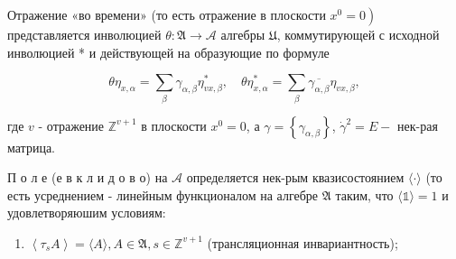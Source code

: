 \documentclass[10pt]{article}
\begin{document}
Отражение «во времени» (то есть отражение в плоскости $\left.x^{0}=0\right)$ представляется инволюцией $\theta: \mathfrak{A} \rightarrow \mathscr{A}$ алгебры $\mathfrak{U}$, коммутирующей с исходной инволюцией * и действующей на образующие по формуле



\[

\theta \eta_{x, \alpha}=\sum_{\beta} \gamma_{\alpha, \beta} \eta_{v x, \beta}^{*}, \quad \theta \eta_{x, \alpha}^{*}=\sum_{\beta} \overline{\gamma_{\alpha, \beta}} \eta_{v x, \beta},

\]



где $v$ - отражение $\mathbb{Z}^{v+1}$ в плоскости $x^{0}=0$, а $\gamma=\left\{\gamma_{\alpha, \beta}\right\}$, $\dot{\gamma}^{2}=E-$ нек-рая матрица.



П о л е (е в к л и д о в о) на $\mathscr{A}$ определяется нек-рым квазисостоянием $\langle\cdot\rangle$ (то есть усреднением - линейным функционалом на алгебре $\mathfrak{A}$ таким, что $\langle\mathbb{1}\rangle=1$ и удовлетворяюшим условиям:



\begin{enumerate}

  \item $\left\langle\tau_{s} A\right\rangle=\langle A\rangle, A \in \mathfrak{A}, s \in \mathbb{Z}^{v+1}$ (трансляционная инвариантность);

\end{enumerate}
\end{document}
